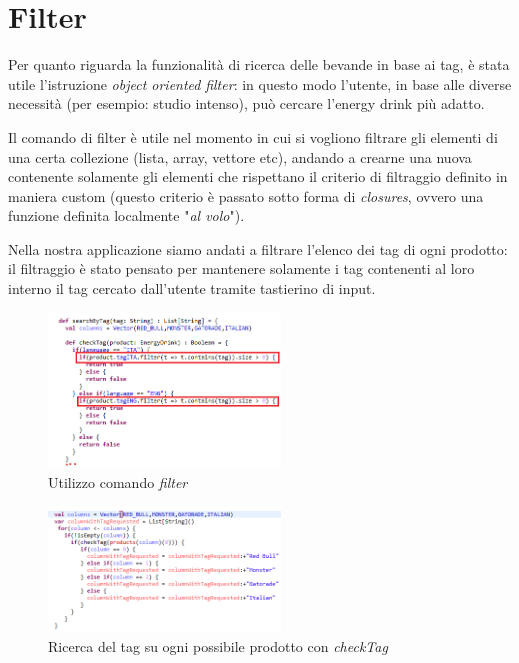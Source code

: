 \newpage
\section{Filter}
\label{sec:filter}
Per quanto riguarda la funzionalità di ricerca delle bevande in base ai tag, è stata utile l'istruzione \textit{object oriented} \textit{filter}: in questo modo l'utente, in base alle diverse necessità (per esempio: studio intenso), può cercare l'energy drink più adatto.

Il comando di filter è utile nel momento in cui si vogliono filtrare gli elementi di una certa collezione (lista, array, vettore etc), andando a crearne una nuova contenente solamente gli elementi che rispettano il criterio di filtraggio definito in maniera custom (questo criterio è passato sotto forma di \textit{closures}, ovvero una funzione definita localmente "\textit{al volo}").

Nella nostra applicazione siamo andati a filtrare l'elenco dei tag di ogni prodotto: il filtraggio è stato pensato per mantenere solamente i tag contenenti al loro interno il tag cercato dall'utente tramite tastierino di input.

\begin{figure}[h]
	\centering
	\includegraphics[width=0.55\textwidth]{Immagini/Filter.png}
	\caption{Utilizzo comando \textit{filter}}
	\label{fig:filter}
\end{figure}

\begin{figure}[h]
	\centering
	\includegraphics[width=0.55\textwidth]{Immagini/RicercaTag.png}
	\caption{Ricerca del tag su ogni possibile prodotto con \textit{checkTag}}
	\label{fig:filterSearch}
\end{figure}

